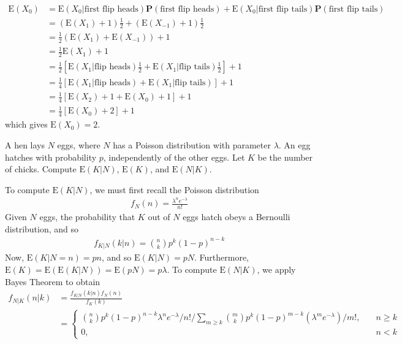 \begin{align*}
	\mathrm{E}(X_0) & = \mathrm{E}(X_0 | \text{first flip heads})\mathbf{P}(\text{first flip heads}) +
	\mathrm{E}(X_0 | \text{first flip tails}) \mathbf{P}(\text{first flip tails})
	\\
	& = (\mathrm{E}(X_1) + 1) \frac{1}{2} + (\mathrm{E}(X_{-1}) + 1) \frac{1}{2}
	\\
	& = \frac{1}{2}(\mathrm{E}(X_1) + \mathrm{E}(X_{-1})) + 1
	\\
	& = \frac{1}{2}\mathrm{E}(X_1) + 1
	\\
	& = \frac{1}{2}[\mathrm{E}(X_1 | \text{flip heads}) \frac{1}{2} + \mathrm{E}(X_1 | \text{flip
	tails}) \frac{1}{2}] + 1
	\\
	& = \frac{1}{4}[\mathrm{E}(X_1 | \text{flip heads}) + \mathrm{E}(X_1 | \text{flip
	tails})] + 1
	\\
	& = \frac{1}{4} [ \mathrm{E}(X_2) + 1  + \mathrm{E}(X_0) + 1] + 1
	\\
	& = \frac{1}{4}[ \mathrm{E}(X_0) + 2] + 1
\end{align*}
which gives $\mathrm{E}(X_0) = 2$.
\begin{example}
	A hen lays $N$ eggs, where $N$ has a Poisson distribution with parameter
	$\lambda$. An egg hatches with probability $p$, independently  of the other
	eggs. Let $K$ be the number of chicks. Compute $\mathrm{E}(K|N)$, $\mathrm{E}(K)$, and $\mathrm{E}(N | 
	K)$.
\end{example}
To compute $\mathrm{E}(K|N)$, we must first recall the Poisson distribution
\begin{align*}
	f_N(n) = \frac{\lambda^n e^{-\lambda}}{n!}
\end{align*}
Given $N$ eggs, the probability that $K$ out of $N$ eggs hatch obeys a 
Bernoulli distribution, and so 
\begin{align*}
	f_{K|N}(k|n) = \binom{n}{k} p^k {(1-p)}^{n-k}
\end{align*}
Now, $\mathrm{E}(K | N = n) = pn$, and so $\mathrm{E}(K | N) = pN$. Furthermore, $\mathrm{E}(K) = \mathrm{E}(\mathrm{E}(K
| N	)) = \mathrm{E}(pN) = p \lambda$.
To compute $\mathrm{E}(N | K)$, we apply Bayes Theorem to obtain
\begin{align*}
	f_{N|K}(n|k) & = \frac{f_{K|N}(k|n)f_N(n)}{f_K(k)}
	\\
	& = \begin{cases}
		\binom{n}{k}p^k {(1-p)}^{n-k} \lambda^n
		e^{-\lambda}/n!/\sum_{m \ge k}
		\binom{m}{k} p^k {(1 - p)}^{m-k} (\lambda^m e^{-\lambda})/m!
		, \quad & n \ge k
		\\
		0, \quad & n<k
	\end{cases}
\end{align*}
